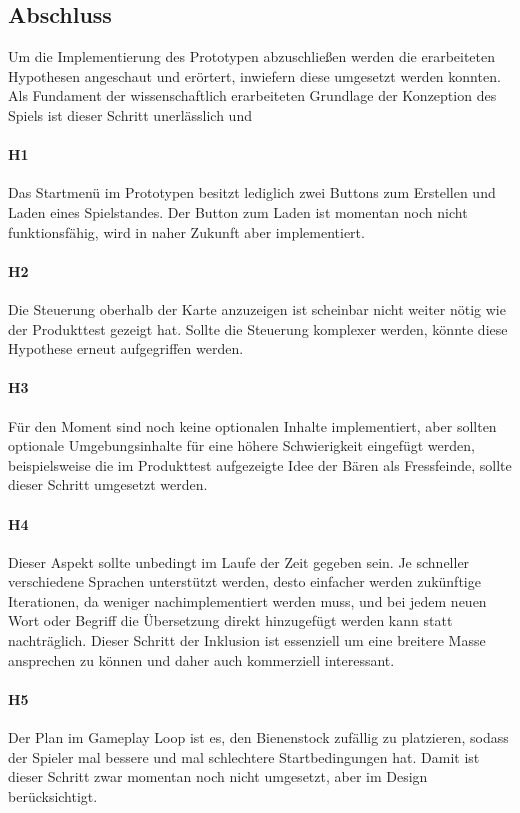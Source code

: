 \subsection{Abschluss}
Um die Implementierung des Prototypen abzuschließen werden die erarbeiteten Hypothesen angeschaut und erörtert, inwiefern diese umgesetzt werden konnten. Als Fundament der wissenschaftlich erarbeiteten Grundlage der Konzeption des Spiels ist dieser Schritt unerlässlich und 

\paragraph*{H1}
Das Startmenü im Prototypen besitzt lediglich zwei Buttons zum Erstellen und Laden eines Spielstandes. Der Button zum Laden ist momentan noch nicht funktionsfähig, wird in naher Zukunft aber implementiert. 

\paragraph*{H2}
Die Steuerung oberhalb der Karte anzuzeigen ist scheinbar nicht weiter nötig wie der Produkttest gezeigt hat. Sollte die Steuerung komplexer werden, könnte diese Hypothese erneut aufgegriffen werden.

\paragraph*{H3}
Für den Moment sind noch keine optionalen Inhalte implementiert, aber sollten optionale Umgebungsinhalte für eine höhere Schwierigkeit eingefügt werden, beispielsweise die im Produkttest aufgezeigte Idee der Bären als Fressfeinde, sollte dieser Schritt umgesetzt werden.

\paragraph*{H4}
Dieser Aspekt sollte unbedingt im Laufe der Zeit gegeben sein. Je schneller verschiedene Sprachen unterstützt werden, desto einfacher werden zukünftige Iterationen, da weniger nachimplementiert werden muss, und bei jedem neuen Wort oder Begriff die Übersetzung direkt hinzugefügt werden kann statt nachträglich. Dieser Schritt der Inklusion ist essenziell um eine breitere Masse ansprechen zu können und daher auch kommerziell interessant.

\paragraph*{H5}
Der Plan im Gameplay Loop ist es, den Bienenstock zufällig zu platzieren, sodass der Spieler mal bessere und mal schlechtere Startbedingungen hat. Damit ist dieser Schritt zwar momentan noch nicht umgesetzt, aber im Design berücksichtigt.

